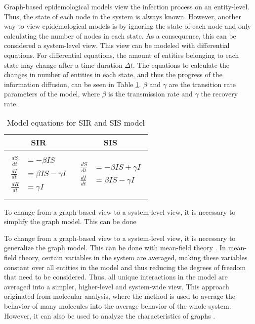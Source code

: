 Graph-based epidemological models view the infection process on an entity-level.
Thus, the state of each node in the system is always known.
However, another way to view epidemological models is by ignoring the 
state of each node and only calculating the number of nodes in each state.
As a consequence, this can be considered a system-level view.
This view can be modeled with differential equations.
For differential equations, the amount of entities belonging to each state may change 
after a time duration $\Delta t$. The equations to calculate the 
changes in number of entities in each state, and thus the progress 
of the information diffusion, can be seen in Table \ref{SI-table-equations}.
$\beta$ and $\gamma$ are the transition rate parameters of the model,
where $\beta$ is the transmission rate and $\gamma$ the 
recovery rate.

\begin{table}[ht!]
    \centering
    \begin{tabular}{|c | c |} 
     \hline
     SIR & SIS  \\ 
     \hline
     & \\
     $\begin{aligned}
          \frac{dS}{dt} &= -\beta I S \\
          \frac{dI}{dt} &= \beta I S - \gamma I \\
          \frac{dR}{dt} &= \gamma I  
        \end{aligned}$
      &
      $\begin{aligned}
          \frac{dS}{dt} &= -\beta I S + \gamma I\\
          \frac{dI}{dt} &= \beta I S - \gamma I
        \end{aligned}$
       \\ 
       & \\
     \hline
    \end{tabular}
    \caption{Model equations for SIR and SIS model \cite{sirequation}}
    \label{SI-table-equations}
\end{table}

To change from a graph-based view to a system-level view, it is necessary
to simplify the graph model. This can be done 

To change from a graph-based view to a system-level view, it is necessary
to generalize the graph model. This can be done with
mean-field theory \cite{chaikin1995principles}.
In mean-field theory, certain variables in the system are averaged, 
making these variables constant over all entities in the model and thus 
reducing the degrees of freedom that need to be considered.
Thus, all unique interactions in the model are averaged into a simpler,
higher-level and system-wide view.
This approach originated from molecular analysis, where the method is used
to average the behavior of many molecules into the average behavior
of the whole system.
However, it can also be used to analyze the characteristics of graphs
\cite{barabasi1999mean}\cite{sirsmodel}.


